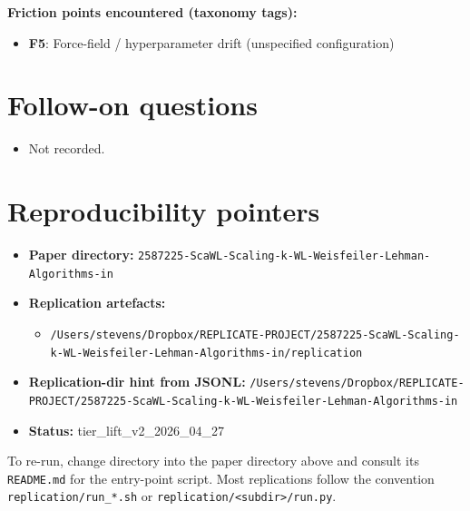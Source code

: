 \documentclass[11pt]{article}
\begin{document}
\noindent\textbf{Friction points encountered (taxonomy tags):}
\begin{itemize}
\item \textbf{F5}: Force-field / hyperparameter drift (unspecified configuration)
\end{itemize}

\section{Follow-on questions}
\begin{itemize}
\item Not recorded.
\end{itemize}

\section{Reproducibility pointers}\label{sec:repro}
\begin{itemize}
\item \textbf{Paper directory:} \texttt{2587225-ScaWL-Scaling-k-WL-Weisfeiler-Lehman-Algorithms-in}
\item \textbf{Replication artefacts:}
\begin{itemize}
\item \texttt{/Users/stevens/Dropbox/REPLICATE-PROJECT/2587225-ScaWL-Scaling-k-WL-Weisfeiler-Lehman-Algorithms-in/replication}
\end{itemize}
\item \textbf{Replication-dir hint from JSONL:} \texttt{/Users/stevens/Dropbox/REPLICATE-PROJECT/2587225-ScaWL-Scaling-k-WL-Weisfeiler-Lehman-Algorithms-in}
\item \textbf{Status:} tier\_lift\_v2\_2026\_04\_27
\end{itemize}

To re-run, change directory into the paper directory above and consult its \texttt{README.md} for the entry-point script. Most replications follow the convention \texttt{replication/run\_*.sh} or \texttt{replication/<subdir>/run.py}.
\end{document}
